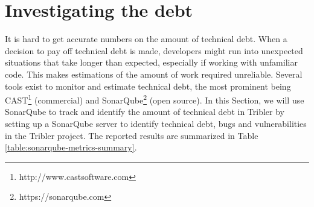 
\section{Investigating the debt}
It is hard to get accurate numbers on the amount of technical debt. When a decision to pay off technical debt is made, developers might run into unexpected situations that take longer than expected, especially if working with unfamiliar code. This makes estimations of the amount of work required unreliable. Several tools exist to monitor and estimate technical debt, the most prominent being CAST\footnote{http://www.castsoftware.com} (commercial) and SonarQube\footnote{https://sonarqube.com}\cite{falessi2015towards} (open source). In this Section, we will use SonarQube to track and identify the amount of technical debt in Tribler by setting up a SonarQube server to identify technical debt, bugs and vulnerabilities in the Tribler project. The reported results are summarized in Table \ref{table:sonarqube-metrics-summary}.\\

